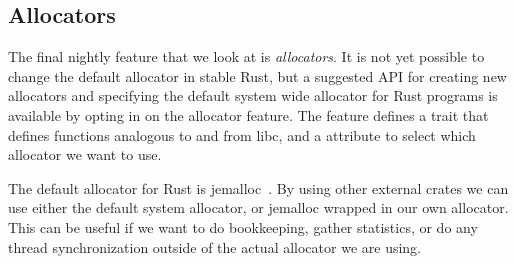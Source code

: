 \subsection{Allocators\label{sec:allocators}}

The final nightly feature that we look at is \emph{allocators}. It is not yet possible to change
the default allocator in stable Rust, but a suggested API for creating new allocators and
specifying the default system wide allocator for Rust programs is available by opting in on the
allocator feature. The feature defines a trait  that defines functions analogous
to  and  from libc, and a attribute  to select
which allocator we want to use.

The default allocator for Rust is jemalloc~\cite{jemalloc}. By using other external crates we can
use either the default system allocator, or jemalloc wrapped in our own allocator. This can be
useful if we want to do bookkeeping, gather statistics, or do any thread synchronization outside of
the actual allocator we are using.

\begin{figure}[ht]

\end{figure}
